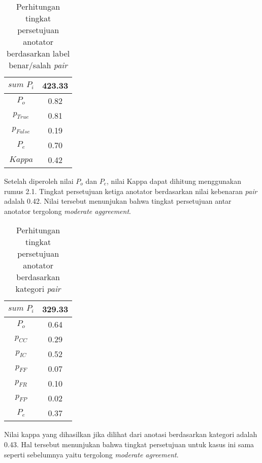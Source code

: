 \begin{table}
  \centering
  \caption{Perhitungan tingkat persetujuan anotator berdasarkan label benar/salah \textit{pair}}
  \label{table:pair-kappa}
  \begin{tabular}{|c|c|}
  \hline
  $sum\,\,P_i$ & 423.33 \\ \hline
  $P_o$ & 0.82 \\ \hline
  $p_{True}$ & 0.81 \\ \hline
  $p_{False}$ & 0.19 \\ \hline
  $P_e$ & 0.70 \\ \hline
  $Kappa$ & 0.42 \\ \hline
  \end{tabular} 
\end{table}

\noindent Setelah diperoleh nilai $P_o$ dan $P_e$, nilai Kappa dapat dihitung menggunakan rumus 2.1. Tingkat persetujuan ketiga anotator berdasarkan nilai kebenaran \textit{pair} adalah 0.42. Nilai tersebut menunjukan bahwa tingkat persetujuan antar anotator tergolong \textit{moderate aggreement}.

\begin{table}
  \centering
  \caption{Perhitungan tingkat persetujuan anotator berdasarkan kategori \textit{pair}}
  \label{table:pair-kappa2}
  \begin{tabular}{|c|c|}
  \hline
  $sum\,\,P_i$ & 329.33 \\ \hline
  $P_o$ & 0.64 \\ \hline
  $p_{CC}$ & 0.29 \\ \hline
  $p_{IC}$ & 0.52 \\ \hline
  $p_{FF}$ & 0.07 \\ \hline
  $p_{FR}$ & 0.10 \\ \hline
  $p_{FP}$ & 0.02 \\ \hline
  $P_e$ & 0.37 \\ \hline
  \end{tabular} 
\end{table}

\noindent Nilai kappa yang dihasilkan jika dilihat dari anotasi berdasarkan kategori adalah 0.43. Hal tersebut menunjukan bahwa tingkat persetujuan untuk kasus ini sama seperti sebelumnya yaitu tergolong \textit{moderate agreement}.

